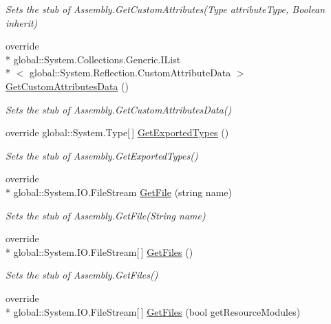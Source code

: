 \begin{DoxyCompactItemize}
\begin{DoxyCompactList}\small\item\em Sets the stub of Assembly.\-Get\-Custom\-Attributes(\-Type attribute\-Type, Boolean inherit)\end{DoxyCompactList}\item 
override \\*
global\-::\-System.\-Collections.\-Generic.\-I\-List\\*
$<$ global\-::\-System.\-Reflection.\-Custom\-Attribute\-Data $>$ \hyperlink{class_system_1_1_reflection_1_1_fakes_1_1_stub_assembly_a06d72c145dc282917b84e844b5bb08f5}{Get\-Custom\-Attributes\-Data} ()
\begin{DoxyCompactList}\small\item\em Sets the stub of Assembly.\-Get\-Custom\-Attributes\-Data()\end{DoxyCompactList}\item 
override global\-::\-System.\-Type\mbox{[}$\,$\mbox{]} \hyperlink{class_system_1_1_reflection_1_1_fakes_1_1_stub_assembly_a1effcad9236a113010306ec77328de74}{Get\-Exported\-Types} ()
\begin{DoxyCompactList}\small\item\em Sets the stub of Assembly.\-Get\-Exported\-Types()\end{DoxyCompactList}\item 
override \\*
global\-::\-System.\-I\-O.\-File\-Stream \hyperlink{class_system_1_1_reflection_1_1_fakes_1_1_stub_assembly_adb9ec6b887dee09cb8d3b71ddd0dc23d}{Get\-File} (string name)
\begin{DoxyCompactList}\small\item\em Sets the stub of Assembly.\-Get\-File(\-String name)\end{DoxyCompactList}\item 
override \\*
global\-::\-System.\-I\-O.\-File\-Stream\mbox{[}$\,$\mbox{]} \hyperlink{class_system_1_1_reflection_1_1_fakes_1_1_stub_assembly_a44394ef2243f06087407ff14990010ea}{Get\-Files} ()
\begin{DoxyCompactList}\small\item\em Sets the stub of Assembly.\-Get\-Files()\end{DoxyCompactList}\item 
override \\*
global\-::\-System.\-I\-O.\-File\-Stream\mbox{[}$\,$\mbox{]} \hyperlink{class_system_1_1_reflection_1_1_fakes_1_1_stub_assembly_a0e6e7a4da2625eff0e6d0f4ba4a2e9fe}{Get\-Files} (bool get\-Resource\-Modules)

\end{DoxyCompactItemize}
